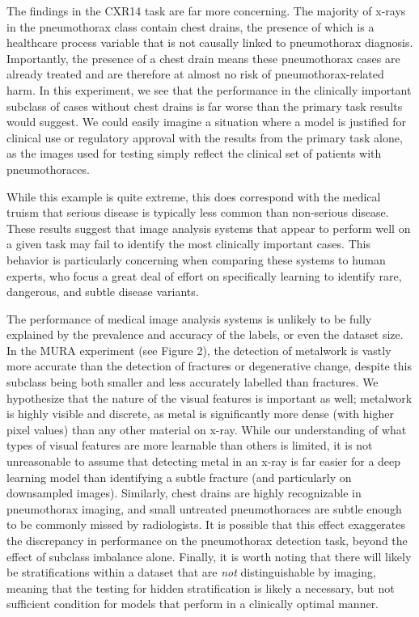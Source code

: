 \documentclass[sigconf]{acmart}
\begin{document}
The findings in the CXR14 task are far more concerning. 
The majority of x-rays in the pneumothorax class contain chest drains, the presence of which is a healthcare process variable that is not causally linked to pneumothorax diagnosis.
 Importantly, the presence of a chest drain means these pneumothorax cases are already treated and are therefore at almost no risk of pneumothorax-related harm. 
 In this experiment, we see that the performance in the clinically important subclass of cases without chest drains is far worse than the primary task results would suggest. 
 We could easily imagine a situation where a model is justified for clinical use or regulatory approval with the results from the primary task alone, as the images used for testing simply reflect the clinical set of patients with pneumothoraces.
 
While this example is quite extreme, this does correspond with the medical truism that serious disease is typically less common than non-serious disease. 
These results suggest that image analysis systems that appear to perform well on a given task may fail to identify the most clinically important cases. 
This behavior is particularly concerning when comparing these systems to human experts, who focus a great deal of effort on specifically learning to identify rare, dangerous, and subtle disease variants.

The performance of medical image analysis systems is unlikely to be fully explained by the prevalence and accuracy of the labels, or even the dataset size. 
In the MURA experiment (see Figure 2), the detection of metalwork is vastly more accurate than the detection of fractures or degenerative change, despite this subclass being both smaller and less accurately labelled than fractures. 
We hypothesize that the nature of the visual features is important as well; metalwork is highly visible and discrete, as metal is significantly more dense (with higher pixel values) than any other material on x-ray. 
While our understanding of what types of visual features are more learnable than others is limited, it is not unreasonable to assume that detecting metal in an x-ray is far easier for a deep learning model than identifying a subtle fracture (and particularly on downsampled images).
Similarly, chest drains are highly recognizable in pneumothorax imaging, and small untreated pneumothoraces are subtle enough to be commonly missed by radiologists. 
It is possible that this effect exaggerates the discrepancy in performance on the pneumothorax detection task, beyond the effect of subclass imbalance alone.
Finally, it is worth noting that there will likely be stratifications within a dataset that are \textit{not} distinguishable by imaging, meaning that the testing for hidden stratification is likely a necessary, but not sufficient condition for models that perform in a clinically optimal manner.
\end{document}
